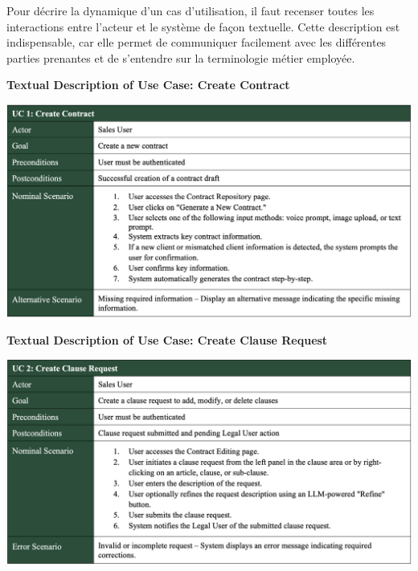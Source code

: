 Pour décrire la dynamique d’un cas d’utilisation, il faut recenser toutes les interactions entre l’acteur et le système de façon textuelle. Cette description est indispensable, car elle permet de communiquer facilement avec les différentes parties prenantes et de s’entendre sur la terminologie métier employée.\mynewline

\textbf{Textual Description of Use Case: Create Contract}\vspace{-0.3cm}

\begin{center}
    \centering
    \includegraphics[width=1\textwidth]{Images/Create Contract Use Case.png}
    \label{tab:create_contract_use_case}
\end{center}

\vspace{0.3cm}

\textbf{Textual Description of Use Case: Create Clause Request}\vspace{-0.3cm}

\begin{center}
    \centering
    \includegraphics[width=1\textwidth]{Images/Create Clause Request Use Case.png}
    \label{tab:create_clause_request_use_case}
\end{center}

